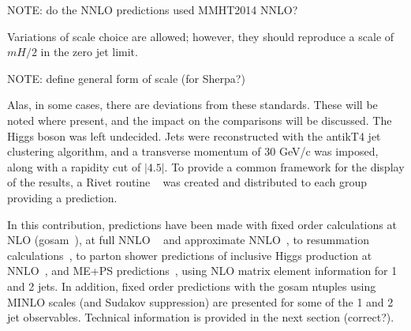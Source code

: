 NOTE: do the NNLO predictions used MMHT2014 NNLO? 

Variations of scale choice are allowed; however, they should reproduce a scale of $mH/2$ in the zero jet 
limit. 

NOTE: define general form of scale (for Sherpa?)

Alas, in some cases, there are deviations from these standards. These will be 
noted where present, and the impact on the comparisons will be discussed. 
The Higgs boson was left undecided. Jets were reconstructed with the antikT4 jet 
clustering algorithm, and a transverse momentum of 30 GeV/c was imposed, along with 
a rapidity cut of $|4.5|$. 
To provide a common framework for the display of the results, a Rivet routine ~\cite{Rivet_routine} was created and distributed to each group providing a prediction. 

In this contribution, predictions have been made with fixed order calculations at NLO 
(gosam~\cite{gosam}), at full NNLO ~\cite{Petriello} and approximate NNLO~\cite{LoopSim}, 
to resummation calculations~\cite{HqT, HEJ, etc}, to parton shower predictions of
inclusive Higgs production at NNLO~\cite{Powheg NNLOPS, Sherpa NNLOPS}, and ME+PS
predictions~\cite{MG5,Sherpa,Herwig7}, using NLO matrix element information for 1 and 2
jets. In addition, fixed order predictions with the gosam ntuples using MINLO scales (and Sudakov suppression)  are presented for 
some of the 1 and 2 jet observables.  Technical information is provided in the next section (correct?). 

